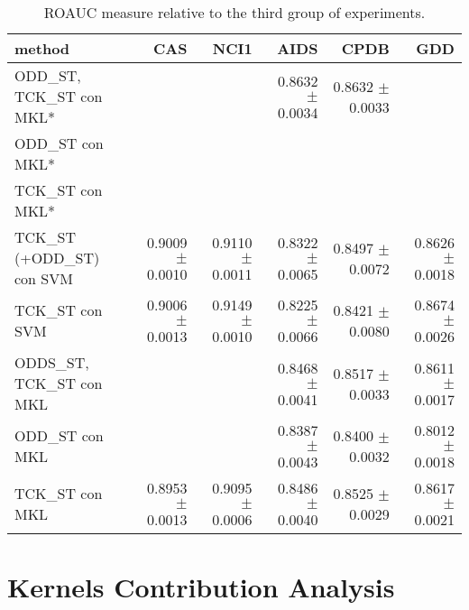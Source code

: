 \begin{landscape}
    \begin{table}[ht]
        \centering
        \begin{tabular}{|l|r|r|r|r|r|}
            \hline
            method&CAS&NCI1&AIDS&CPDB&GDD\\
            \hline
            ODD\_ST, TCK\_ST con MKL*&&&0.8632 $\pm$ 0.0034&0.8632 $\pm$ 0.0033&\\
            \hline
            ODD\_ST con MKL*&&&&&\\
            \hline
            TCK\_ST con MKL*&&&&&\\
            \hline
            TCK\_ST (+ODD\_ST) con SVM&0.9009 $\pm$ 0.0010&0.9110 $\pm$ 0.0011&0.8322 $\pm$ 0.0065&0.8497 $\pm$ 0.0072&0.8626 $\pm$ 0.0018\\
            \hline
            TCK\_ST con SVM&0.9006 $\pm$ 0.0013&0.9149 $\pm$ 0.0010&0.8225 $\pm$ 0.0066&0.8421 $\pm$ 0.0080&0.8674 $\pm$ 0.0026\\
            \hline
            ODDS\_ST, TCK\_ST con MKL&&&0.8468 $\pm$ 0.0041&0.8517 $\pm$ 0.0033&0.8611 $\pm$ 0.0017\\
            \hline
            ODD\_ST con MKL&&&0.8387 $\pm$ 0.0043&0.8400 $\pm$ 0.0032&0.8012$\pm$ 0.0018\\
            \hline
            TCK\_ST con MKL&0.8953 $\pm$ 0.0013&0.9095 $\pm$ 0.0006&0.8486 $\pm$ 0.0040&0.8525 $\pm$ 0.0029&0.8617 $\pm$ 0.0021\\
            \hline
        \end{tabular}
        \label{table:results_wl}
        \caption{ROAUC measure relative to the third group of experiments. }
    \end{table}
\end{landscape}

\section{Kernels Contribution Analysis}


